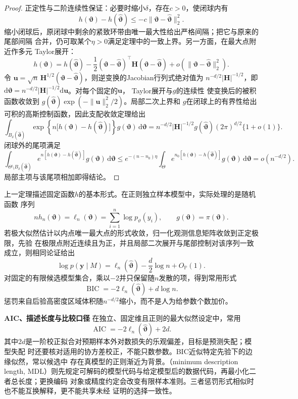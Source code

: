\begin{proof}
正定性与二阶连续性保证：必要时缩小\(\delta\)，存在\(c>0\)，使闭球内有
\[
  h(\bm\vartheta)-h(\widehat{\bm\vartheta})
  \leq-c\lVert\bm\vartheta-\widehat{\bm\vartheta}\rVert_2^2.
\]
缩小闭球后，原闭球中剩余的紧致环带由唯一最大性给出严格间隔；把它与原来的尾部间隔
合并，仍可取某个\(\eta>0\)满足定理中的一致上界。另一方面，在最大点附近作多元
Taylor展开：
\[
  h(\bm\vartheta)
  =
  h(\widehat{\bm\vartheta})
  -\frac12(\bm\vartheta-\widehat{\bm\vartheta})^\top
  \bm H(\bm\vartheta-\widehat{\bm\vartheta})
  +o(\lVert\bm\vartheta-\widehat{\bm\vartheta}\rVert_2^2).
\]
令
\(\bm u=\sqrt n\,\bm H^{1/2}
(\bm\vartheta-\widehat{\bm\vartheta})\)，则逆变换的Jacobian行列式绝对值为
\(n^{-d/2}|\bm H|^{-1/2}\)，即
\(\mathrm d\bm\vartheta
=n^{-d/2}|\bm H|^{-1/2}\mathrm d\bm u\)。对每个固定的\(\bm u\)，
Taylor展开与\(g\)的连续性
使变换后的被积函数收敛到
\(g(\widehat{\bm\vartheta})\exp(-\lVert\bm u\rVert_2^2/2)\)。局部二次上界和
\(g\)在闭球上的有界性给出可积的高斯控制函数，因此支配收敛定理给出
\[
  \int_{B_\delta(\widehat{\bm\vartheta})}
  \exp\!\left\{n\bigl[h(\bm\vartheta)
    -h(\widehat{\bm\vartheta})\bigr]\right\}
  g(\bm\vartheta)\,\mathrm d\bm\vartheta
  =
  n^{-d/2}|\bm H|^{-1/2}
  g(\widehat{\bm\vartheta})(2\pi)^{d/2}\{1+o(1)\}.
\]
闭球外的尾项满足
\[
  \int_{\Theta\setminus B_\delta(\widehat{\bm\vartheta})}
  e^{n[h(\bm\vartheta)-h(\widehat{\bm\vartheta})]}
  g(\bm\vartheta)\,\mathrm d\bm\vartheta
  \leq
  e^{-(n-n_0)\eta}
  \int_\Theta
  e^{n_0[h(\bm\vartheta)-h(\widehat{\bm\vartheta})]}
  g(\bm\vartheta)\,\mathrm d\bm\vartheta
  =o(n^{-d/2}).
\]
局部主项与该尾项相加即得结论。
\end{proof}

上一定理描述固定函数\(h\)的基本形式。在正则独立样本模型中，实际处理的是随机函数
序列
\[
  nh_n(\bm\vartheta)=\ell_n(\bm\vartheta)
  =\sum_{i=1}^n\log p_\vartheta(y_i),\qquad
  g(\bm\vartheta)=\pi(\bm\vartheta).
\]
若极大似然估计以内点唯一最大点的形式收敛，归一化观测信息矩阵收敛到正定极限，先验
在极限点附近连续且为正，并且局部二次展开与尾部控制对该序列一致成立，则相同论证给出
\[
  \log p(\bm y\mid M)
  =
  \ell_n(\widehat{\bm\vartheta})
  -\frac d2\log n+O_{\mathbb{P}}(1).
\]
对固定的有限候选模型集合，乘以\(-2\)并只保留随\(n\)发散的项，得到常用形式
\[
  \operatorname{BIC}
  =-2\ell_n(\widehat{\bm\vartheta})+d\log n.
\]
惩罚来自后验高密度区域体积随\(n^{-d/2}\)缩小，而不是人为给参数个数加价。

\par\medskip\noindent\textbf{AIC、描述长度与比较口径}\quad
在独立、固定维且正则的最大似然设定中，常用
\[
  \operatorname{AIC}
  =-2\ell_n(\widehat{\bm\vartheta})+2d.
\]
其中\(2d\)是一阶校正拟合对预期样本外对数损失的乐观偏差，目标是预测失配；模型失配
时还要核对适用的协方差校正，不能只数参数。BIC近似特定先验下的边缘似然，常以候选中
存在真模型的正则渐近为背景。（minimum description length,
MDL）则先规定可解码的模型代码与给定模型后的数据代码，再最小化二者总长度；更换编码
对象或精度约定会改变有限样本准则。三者惩罚形式相似时也不能互换解释，更不能共享未经
证明的选择一致性。

